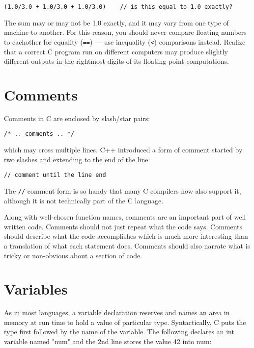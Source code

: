 \begin{lstlisting}
(1.0/3.0 + 1.0/3.0 + 1.0/3.0)    // is this equal to 1.0 exactly?
\end{lstlisting}

The sum may or may not be 1.0 exactly, and it may vary from one type of machine to another. For this reason, you should never compare floating numbers to eachother for equality (\lstinline{==}) --- use inequality (\lstinline{<}) comparisons instead. Realize that a correct C program run on different computers may produce slightly different outputs in the rightmost digits of its floating point computations.

\section{Comments}

Comments in C are enclosed by slash/star pairs:

\begin{lstlisting}
/* .. comments .. */ 
\end{lstlisting}

which may cross multiple lines. C++ introduced a form of comment started by two slashes and extending to the end of the line:

\begin{lstlisting}
// comment until the line end
\end{lstlisting}

The \lstinline{//} comment form is so handy that many C compilers now also support it, although it is not technically part of the C language.

Along with well-chosen function names, comments are an important part of well written code. Comments should not just repeat what the code says. Comments should describe what the code accomplishes which is much more interesting than a translation of what each statement does. Comments should also narrate what is tricky or non-obvious about a section of code.

\section{Variables}

As in most languages, a variable declaration reserves and names an area in memory at run time to hold a value of particular type. Syntactically, C puts the type first followed by the name of the variable. The following declares an int variable named "num" and the 2nd line stores the value 42 into num:

